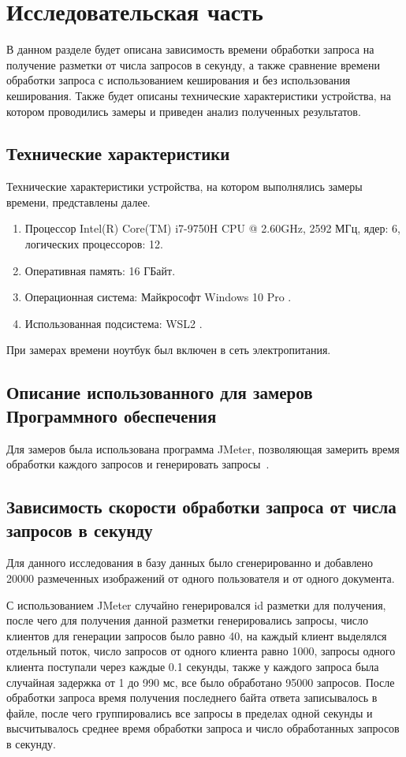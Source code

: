 \chapter{Исследовательская часть}

В данном разделе будет описана зависимость времени обработки запроса на получение разметки от числа запросов в секунду, а также сравнение времени обработки запроса с использованием кеширования и без использования кеширования. Также будет описаны технические характеристики устройства, на котором проводились замеры и приведен анализ полученных результатов.

\section{Технические характеристики}

Технические характеристики устройства, на котором выполнялись замеры времени, представлены далее.

\begin{enumerate}
	\item Процессор	Intel(R) Core(TM) i7-9750H CPU @ 2.60GHz, 2592 МГц, ядер: 6, логических процессоров: 12.
	\item Оперативная память: 16 ГБайт.
	\item Операционная система: Майкрософт Windows 10 Pro \cite{windows}.
	\item Использованная подсистема: WSL2 \cite{WSL2}.
\end{enumerate}

При замерах времени ноутбук был включен в сеть электропитания.


\section{Описание использованного для замеров Программного обеспечения}
Для замеров была использована программа JMeter, позволяющая замерить время обработки каждого запросов и генерировать запросы~\cite{JMeter}.


\section{Зависимость скорости обработки запроса от числа запросов в секунду}
Для данного исследования в базу данных было сгенерированно и добавлено 20000 размеченных изображений от одного пользователя и от одного документа.

С использованием JMeter случайно генерировался id разметки для получения, после чего для получения данной разметки генерировались запросы, число клиентов для генерации запросов было равно 40, на каждый клиент выделялся отдельный поток, число запросов от одного клиента равно 1000, запросы одного клиента поступали через каждые 0.1 секунды, также у каждого запроса была случайная задержка от 1 до 990 мс, все было обработано 95000 запросов. После обработки запроса время получения последнего байта ответа записывалось в файле, после чего группировались все запросы в пределах одной секунды и высчитывалось среднее время обработки запроса и число обработанных запросов в секунду. 

